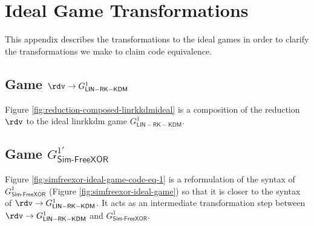 \chapter{Ideal Game Transformations}
\label{app:intermediategames}
This appendix describes the transformations to the ideal games in order to clarify the transformations we make to claim code equivalence.

\section{Game \texorpdfstring{$\rdv \to G^{1}_{\mathsf{LIN-RK-KDM}}$}{Game R -> G\_LIN-RK-KDM-Ideal}}
\label{app:sec:reduction-composed-linrkkdmideal}

Figure \ref{fig:reduction-composed-linrkkdmideal} is a composition of the reduction $\rdv$ to the ideal \acrshort{linrkkdm} game $G^{1}_{\mathsf{LIN-RK-KDM}}$.


\section{Game \texorpdfstring{$G^{1'}_\mathsf{Sim\text{-}FreeXOR}$}{Game Sim-FreeXOR-Ideal'}}
\label{app:sec:simfreexor-ideal-game-code-eq-1}

Figure \ref{fig:simfreexor-ideal-game-code-eq-1} is a reformulation of the syntax of $G^{1}_\mathsf{Sim\text{-}FreeXOR}$ (Figure \ref{fig:simfreexor-ideal-game}) so that it is closer to the syntax of $\rdv \to G^{1}_{\mathsf{LIN-RK-KDM}}$. It acts as an intermediate transformation step between $\rdv \to G^{1}_{\mathsf{LIN-RK-KDM}}$ and $G^{1}_\mathsf{Sim\text{-}FreeXOR}$.